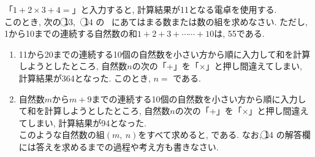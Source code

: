 \documentclass[dvipdfmx, titlepage, 11pt]{jsarticle}
\newcommand{\ncircle}[1]{\textcircled{\scriptsize #1}}
\newcommand{\nbox}[1]{\fbox{\hspace{5pt} \textcircled{\scriptsize #1}\hspace{5pt} }}
\newcommand{\ebox}{\fbox{　\hspace{10pt} }}
\begin{document}
\newpage
\noindent {}\hspace{10pt} 「$1+2\times 3+4=$」と入力すると, 計算結果が11となる電卓を使用する.\\
このとき, 次の \ncircle{13},\ \ \ncircle{14} の \ebox \ にあてはまる数または数の組を求めなさい. ただし, 1から10までの連続する自然数の和$1+2+3+\cdots\cdots+10$は, 55である.
\begin{enumerate}[(1)]
\item 11から20までの連続する10個の自然数を小さい方から順に入力して和を計算しようとしたところ, 自然数$n$の次の「+」を「$\times$」と押し間違えてしまい, 計算結果が364となった. このとき, $n=$ \nbox{13} である.\\[6cm]
\item 自然数$m$から$m+9$までの連続する10個の自然数を小さい方から順に入力して和を計算しようとしたところ, 自然数$n$の次の「+」を「$\times$」と押し間違えてしまい, 計算結果が94となった.\\
  このような自然数の組$(m,\ n)$をすべて求めると, \nbox{14} である. なお, \ncircle{14} の解答欄には答えを求めるまでの過程や考え方も書きなさい.
\end{enumerate}
\newpage
\thispagestyle{empty}
　
\newpage
\newpage
\thispagestyle{empty}
　
\newpage
\end{document}
